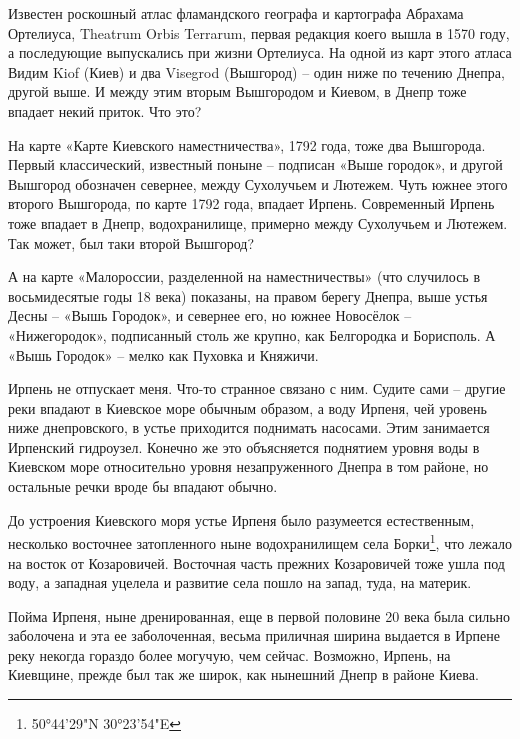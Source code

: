Известен роскошный атлас фламандского географа и картографа Абрахама Ортелиуса, Theatrum Orbis Terra\-rum, первая редакция коего вышла в 1570 году, а последующие выпускались при жизни Ортелиуса. На одной из карт этого атласа Видим Kiof (Киев) и два Visegrod (Вышгород) – один ниже по течению Днепра, другой выше. И между этим вторым Вышгородом и Киевом, в Днепр тоже впадает некий приток. Что это?


На карте «Карте Киевского наместничества», 1792 года, тоже два Вышгорода. Первый классический, известный поныне – подписан «Выше городок», и другой Вышгород обозначен севернее, между Сухолучьем и Лютежем. Чуть южнее этого второго Вышгорода, по карте 1792 года, впадает Ирпень. Современный Ирпень тоже впадает в Днепр, водохранилище, примерно между Сухолучьем и Лютежем. Так может, был таки второй Вышгород?

А на карте «Малороссии, разделенной на наместничествы» (что случилось в восьмидесятые годы 18 века) показаны, на правом берегу Днепра, выше устья Десны – «Вышь Городок», и севернее его, но южнее Новосёлок – «Нижегородок», подписанный столь же крупно, как Белгородка и Борисполь. А «Вышь Городок» – мелко как Пуховка и Княжичи.

Ирпень не отпускает меня. Что-то странное связано с ним. Судите сами – другие реки впадают в Киевское море обычным образом, а воду Ирпеня, чей уровень ниже днепровского, в устье приходится поднимать насосами. Этим занимается Ирпенский гидроузел. Конечно же это объясняется поднятием уровня воды в Киевском море относительно уровня незапруженного Днепра в том районе, но остальные речки вроде бы впадают обычно.

До устроения Киевского моря устье Ирпеня было разумеется естественным, несколько восточнее затопленного ныне водохранилищем села Борки\footnote{50°44'29"N 30°23'54"E}, что лежало на восток от Козаровичей. Восточная часть прежних Козаровичей тоже ушла под воду, а западная уцелела и развитие села пошло на запад, туда, на материк.

Пойма Ирпеня, ныне дренированная, еще в первой половине 20 века была сильно заболочена и эта ее заболоченная, весьма приличная ширина выдается в Ирпене реку некогда гораздо более могучую, чем сейчас. Возможно, Ирпень, на Киевщине, прежде был так же широк, как нынешний Днепр в районе Киева.




